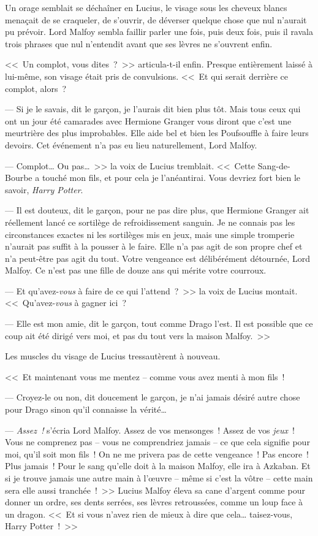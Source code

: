 Un orage semblait se déchaîner en Lucius, le visage sous les cheveux blancs menaçait de se craqueler, de s'ouvrir, de déverser quelque chose que nul n'aurait pu prévoir. Lord Malfoy sembla faillir parler une fois, puis deux fois, puis il ravala trois phrases que nul n'entendit avant que ses lèvres ne s'ouvrent enfin.

<<~Un complot, vous dites~?~>> articula-t-il enfin. Presque entièrement laissé à lui-même, son visage était pris de convulsions. <<~Et qui serait derrière ce complot, alors~?

--- Si je le savais, dit le garçon, je l'aurais dit bien plus tôt. Mais tous ceux qui ont un jour été camarades avec Hermione Granger vous diront que c'est une meurtrière des plus improbables. Elle aide bel et bien les Poufsouffle à faire leurs devoirs. Cet événement n'a pas eu lieu naturellement, Lord Malfoy.

--- Complot… Ou pas…~>> la voix de Lucius tremblait. <<~Cette Sang-de-Bourbe a touché mon fils, et pour cela je l'anéantirai. Vous devriez fort bien le savoir, \emph{Harry Potter}.

--- Il est douteux, dit le garçon, pour ne pas dire plus, que Hermione Granger ait réellement lancé ce sortilège de refroidissement sanguin. Je ne connais pas les circonstances exactes ni les sortilèges mis en jeux, mais une simple tromperie n'aurait pas suffit à la pousser à le faire. Elle n'a pas agit de son propre chef et n'a peut-être pas agit du tout. Votre vengeance est délibérément détournée, Lord Malfoy. Ce n'est pas une fille de douze ans qui mérite votre courroux.

--- Et qu'avez-\emph{vous} à faire de ce qui l'attend~?~>> la voix de Lucius montait. <<~Qu'avez-\emph{vous} à gagner ici~?

--- Elle est mon amie, dit le garçon, tout comme Drago l'est. Il est possible que ce coup ait été dirigé vers moi, et pas du tout vers la maison Malfoy.~>>

Les muscles du visage de Lucius tressautèrent à nouveau.

<<~Et maintenant vous me mentez -- comme vous avez menti à mon fils~!

--- Croyez-le ou non, dit doucement le garçon, je n'ai jamais désiré autre chose pour Drago sinon qu'il connaisse la vérité…

--- \emph{Assez~!} s'écria Lord Malfoy. Assez de vos mensonges~! Assez de vos \emph{jeux}~! Vous ne comprenez pas -- vous ne comprendriez jamais -- ce que cela signifie pour moi, qu'il soit mon fils~! On ne me privera pas de cette vengeance~! Pas encore~! Plus jamais~! Pour le sang qu'elle doit à la maison Malfoy, elle ira à Azkaban. Et si je trouve jamais une autre main à l'œuvre -- même si c'est la vôtre -- cette main sera elle aussi tranchée~!~>> Lucius Malfoy éleva sa cane d'argent comme pour donner un ordre, ses dents serrées, ses lèvres retroussées, comme un loup face à un dragon. <<~Et si vous n'avez rien de mieux à dire que cela… taisez-vous, Harry Potter~!~>>

